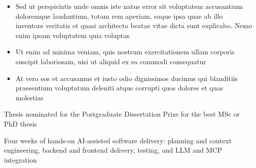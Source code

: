\documentclass[10pt,a4paper,withhyper,ragged2e]{altacv}
\begin{document}
\begin{itemize}
  \item Sed ut perspiciatis unde omnis iste natus error sit voluptatem accusantium doloremque
        laudantium, totam rem aperiam, eaque ipsa quae ab illo inventore veritatis et quasi
        architecto beatae vitae dicta sunt explicabo. Nemo enim ipsam voluptatem quia voluptas
  \item Ut enim ad minima veniam, quis nostrum exercitationem ullam corporis suscipit laboriosam,
        nisi ut aliquid ex ea commodi consequatur
  \item At vero eos et accusamus et iusto odio dignissimos ducimus qui blanditiis praesentium
        voluptatum deleniti atque corrupti quos dolores et quas molestias
\end{itemize}




Thesis nominated for the Postgraduate Dissertation Prize for the best MSc or PhD thesis



Four weeks of hands-on AI-assisted software delivery: planning and context engineering, backend
and frontend delivery, testing, and LLM and MCP integration
\end{document}
